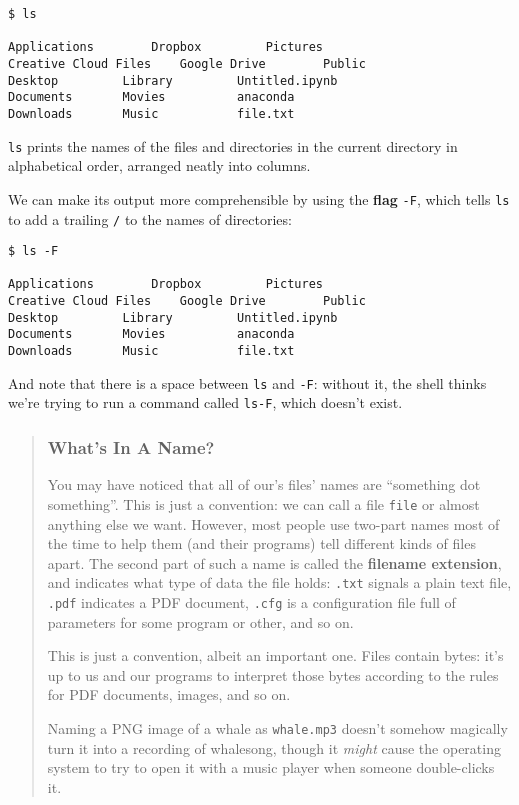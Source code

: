 \documentclass[
]{book}
\begin{document}
\begin{verbatim}
$ ls

Applications        Dropbox         Pictures
Creative Cloud Files    Google Drive        Public
Desktop         Library         Untitled.ipynb
Documents       Movies          anaconda
Downloads       Music           file.txt
\end{verbatim}

\texttt{ls} prints the names of the files and directories in the current directory in alphabetical order, arranged neatly into columns.

We can make its output more comprehensible by using the \textbf{flag} \texttt{-F}, which tells \texttt{ls} to add a trailing \texttt{/} to the names of directories:

\begin{verbatim}
$ ls -F

Applications        Dropbox         Pictures
Creative Cloud Files    Google Drive        Public
Desktop         Library         Untitled.ipynb
Documents       Movies          anaconda
Downloads       Music           file.txt
\end{verbatim}

And note that there is a space between \texttt{ls} and \texttt{-F}: without it, the shell thinks we're trying to run a command called \texttt{ls-F}, which doesn't exist.

\begin{quote}
\hypertarget{whats-in-a-name}{%
\subsubsection{What's In A Name?}\label{whats-in-a-name}}

You may have noticed that all of our's files' names are ``something dot something''. This is just a convention: we can call a file \texttt{file} or almost anything else we want. However, most people use two-part names most of the time to help them (and their programs) tell different kinds of files apart. The second part of such a name is called the \textbf{filename extension}, and indicates what type of data the file holds:
\texttt{.txt} signals a plain text file, \texttt{.pdf} indicates a PDF document, \texttt{.cfg} is a configuration file full of parameters for some program or other, and so on.

This is just a convention, albeit an important one. Files contain bytes: it's up to us and our programs to interpret those bytes according to the rules for PDF documents, images, and so on.

Naming a PNG image of a whale as \texttt{whale.mp3} doesn't somehow magically turn it into a recording of whalesong, though it \emph{might} cause the operating system to try to open it with a music player when someone double-clicks it.
\end{quote}
\end{document}
